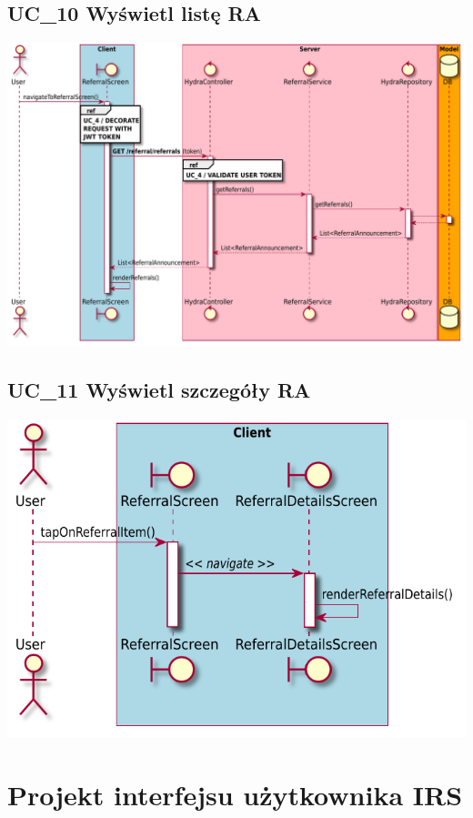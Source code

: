 \documentclass[oneside]{scrreprt}
\begin{document}
\section{UC\_10 Wyświetl listę RA}
\includegraphics[width=\textwidth, keepaspectratio]{graphics/sequence_diagram_referral_list.pdf}

\section{UC\_11 Wyświetl szczegóły RA}
\includegraphics[width=\textwidth, keepaspectratio]{graphics/sequence_diagram_referral_details.pdf}

\chapter{Projekt interfejsu użytkownika IRS}
\end{document}
